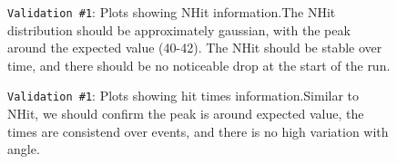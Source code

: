 \documentclass[12pt]{article}
\begin{document}
\begin{figure}
\centering
\noindent{}
  \caption{\centering \texttt{Validation \#1}: Plots showing NHit information.\hspace{\textwidth}The NHit distribution should be approximately gaussian, with the peak around the expected value (40-42). The NHit should be stable over time, and there should be no noticeable drop at the start of the run.}
  \label{fig:val9}
\end{figure}

\begin{figure}
\centering
\noindent{}
  \caption{\centering \texttt{Validation \#1}: Plots showing hit times information.\hspace{\textwidth}Similar to NHit, we should confirm the peak is around expected value, the times are consistend over events, and there is no high variation with angle.}
  \label{fig:val10}
\end{figure}
\end{document}
